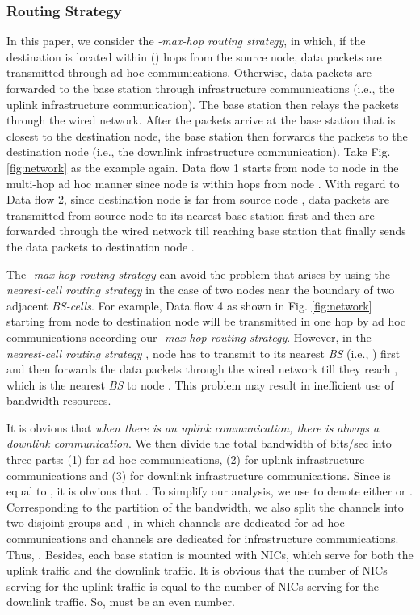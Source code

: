 \documentclass[10pt,journal]{IEEEtran}
\begin{document}
\subsubsection{Routing Strategy}
In this paper, we consider the \textit{-max-hop routing strategy}, in which, if the destination is located within  () hops from the source node, data packets are transmitted through ad hoc communications. Otherwise, data packets are forwarded to the base station through infrastructure communications (i.e., the uplink infrastructure communication). The base station then relays the packets through the wired network. After the packets arrive at the base station that is closest to the destination node, the base station then forwards the packets to the destination node (i.e., the downlink infrastructure communication). Take Fig. \ref{fig:network} as the example again. Data flow 1 starts from node  to node  in the multi-hop ad hoc manner since node  is within  hops from node . With regard to Data flow 2, since destination node  is far from source node , data packets are transmitted from source node  to its nearest base station  first and then are forwarded through the wired network till reaching base station  that finally sends the data packets to destination node . 

The \textit{-max-hop routing strategy} can avoid the problem that arises by using the \textit{-nearest-cell routing strategy} in the case of two nodes near the boundary of two adjacent \emph{BS-cells}. For example, Data flow 4 as shown in Fig. \ref{fig:network} starting from node  to destination node  will be transmitted in one hop by ad hoc communications according our \textit{-max-hop routing strategy}. However, in the \textit{-nearest-cell routing strategy} \cite{bliu:infocom2003}, node  has to transmit to its nearest \emph{BS} (i.e., ) first and then  forwards the data packets through the wired network till they reach , which is the nearest \emph{BS} to node . This problem may result in inefficient use of bandwidth resources. 

It is obvious that \textit{when there is an uplink communication, there is always a downlink communication}. We then divide the total bandwidth of  bits/sec into three parts: (1)  for ad hoc communications, (2)  for uplink infrastructure communications and (3)  for downlink infrastructure communications. Since  is equal to , it is obvious that . To simplify our analysis, we use  to denote either  or . Corresponding to the partition of the bandwidth, we also split the  channels into two disjoint groups  and , in which  channels are dedicated for ad hoc communications and  channels are dedicated for infrastructure communications. Thus, . Besides, each base station is mounted with  NICs, which serve for both the uplink traffic and the downlink traffic. It is obvious that the number of NICs serving for the uplink traffic is equal to the number of NICs serving for the downlink traffic. So,  must be an even number.
\end{document}
